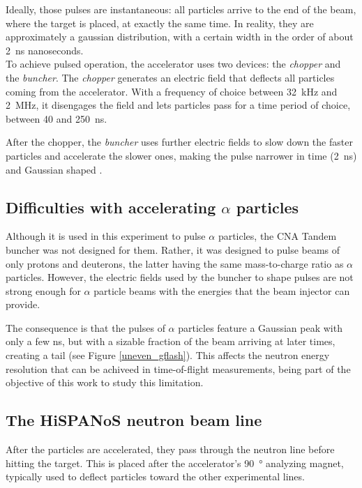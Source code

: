 \documentclass[a4paper,12pt]{report}
\begin{document}
Ideally, those pulses are instantaneous: all particles arrive to the end of the beam, where the target is placed, at exactly the same time.
In reality, they are approximately a gaussian distribution, with a certain width in the order of about \qty{2}{\nano\second} nanoseconds.
\\

To achieve pulsed operation, the accelerator uses two devices: the \textit{chopper} and the \textit{buncher}.
The \textit{chopper} generates an electric field that deflects all particles coming from the accelerator.
With a frequency of choice between \qty{32}{\kilo\Hz} and \qty{2}{\mega\Hz}, it disengages the field and lets particles pass for a time period of choice, between 40 and \qty{250}{\nano\second}.

After the chopper, the \textit{buncher} uses further electric fields to slow down the faster particles and accelerate the slower ones, making the pulse narrower in time (\qty{2}{\nano\second}) and Gaussian shaped \cite{hispanos}.
\\

\subsection{Difficulties with accelerating $\alpha$ particles}
Although it is used in this experiment to pulse $\alpha$ particles, the CNA Tandem buncher was not designed for them.
Rather, it was designed to pulse beams of only protons and deuterons, the latter having the same mass-to-charge ratio as $\alpha$ particles.
However, the electric fields used by the buncher to shape pulses are not strong enough for $\alpha$ particle beams with the energies that the beam injector can provide.

The consequence is that the pulses of $\alpha$ particles feature a Gaussian peak with only a few \unit{\nano\second}, but with a sizable fraction of the beam arriving at later times, creating a tail (see Figure \ref{uneven_gflash}).
This affects the neutron energy resolution that can be achiveed in time-of-flight measurements, being part of the objective of this work to study this limitation.
\\

\subsection{The HiSPANoS neutron beam line}
After the particles are accelerated, they pass through the neutron line before hitting the target.
This is placed after the accelerator's \qty{90}{\degree} analyzing magnet, typically used to deflect particles toward the other experimental lines.
\end{document}
